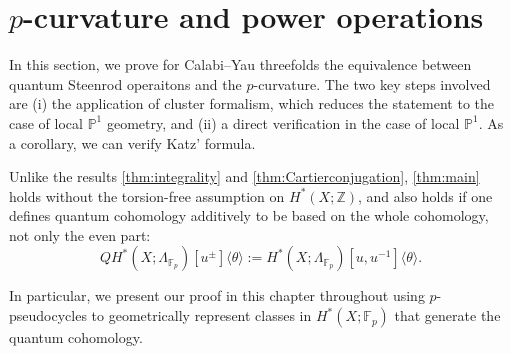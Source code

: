 \documentclass[reqno]{amsart}
\numberwithin{equation}{section}
\numberwithin{equation}{section}
\numberwithin{equation}{section}
\theoremstyle{definition}
\theoremstyle{remark}
\theoremstyle{remark}
\newtheorem{rem}[thm]{Remark}
\begin{document}


\section{$p$-curvature and power operations}

In this section, we prove for Calabi--Yau threefolds the equivalence between quantum Steenrod operaitons and the $p$-curvature. The two key steps involved are (i) the application of cluster formalism, which reduces the statement to the case of local $\mathbb{P}^1$ geometry, and (ii) a direct verification in the case of local $\mathbb{P}^1$. As a corollary, we can verify Katz' formula.


Unlike the results \cref{thm:integrality} and \cref{thm:Cartierconjugation}, \cref{thm:main} holds without the torsion-free assumption on $H^{*}(X;\mathbb{Z})$, and also holds if one defines quantum cohomology additively to be based on the whole cohomology, not only the even part:
$$QH^*(X;\Lambda_{\mathbb{F}_p}) [u^\pm] \langle \theta \rangle := H^*(X;\Lambda_{\mathbb{F}_p}) [u, u^{-1}]\langle \theta \rangle.$$ 

In particular, we present our proof in this chapter throughout using $p$-pseudocycles to geometrically represent classes in $H^*(X;\mathbb{F}_p)$ that generate the quantum cohomology.
\end{document}
